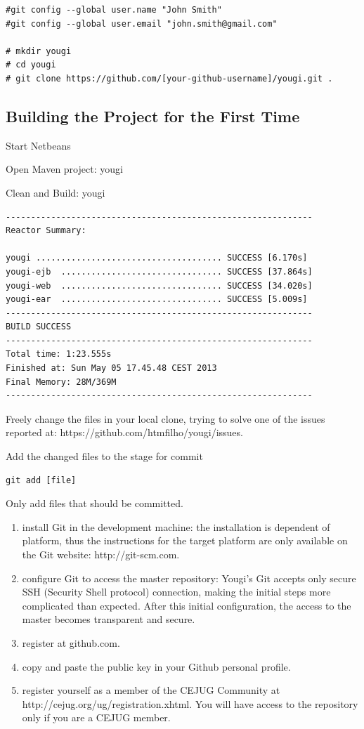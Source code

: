\documentclass[envcountsame,envcountchap]{svmono}
\begin{document}
\begin{verbatim}
#git config --global user.name "John Smith"
#git config --global user.email "john.smith@gmail.com"

# mkdir yougi
# cd yougi
# git clone https://github.com/[your-github-username]/yougi.git .
\end{verbatim}

\subsection{Building the Project for the First Time}

Start Netbeans

Open Maven project: yougi

Clean and Build: yougi

\begin{verbatim}
-------------------------------------------------------------
Reactor Summary:

yougi ..................................... SUCCESS [6.170s]
yougi-ejb  ................................ SUCCESS [37.864s]
yougi-web  ................................ SUCCESS [34.020s]
yougi-ear  ................................ SUCCESS [5.009s]
-------------------------------------------------------------
BUILD SUCCESS
-------------------------------------------------------------
Total time: 1:23.555s
Finished at: Sun May 05 17.45.48 CEST 2013
Final Memory: 28M/369M
-------------------------------------------------------------
\end{verbatim}

Freely change the files in your local clone, trying to solve one of the issues reported at: https://github.com/htmfilho/yougi/issues.

Add the changed files to the stage for commit

\begin{verbatim}
git add [file]
\end{verbatim}

Only add files that should be committed.

\begin{enumerate}
\item install Git in the development machine: the installation is dependent of platform, thus the instructions for the target platform are only available on the Git website: http://git-scm.com.
\item configure Git to access the master repository: Yougi's Git accepts only secure SSH (Security Shell protocol) connection, making the initial steps more complicated than expected. After this initial configuration, the access to the master becomes transparent and secure.
\item register at github.com.
\item copy and paste the public key in your Github personal profile.
\item register yourself as a member of the CEJUG Community at \\ http://cejug.org/ug/registration.xhtml. You will have access to the repository only if you are a CEJUG member.
\end{enumerate}
\end{document}
